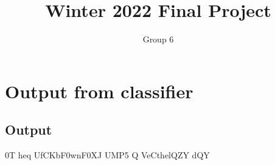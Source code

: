 \documentclass[11pt]{article}
\title{Winter 2022 Final Project}
\author{Group 6}
\begin{document}
\maketitle
\tableofcontents\newpage\newpage
\section{Output from classifier}
\label{section1}
\subsection{Output}
\label{Sec1_L2_Introduction}
0T heq UfCKbF0wnF0XJ UMP5   \newline Q VeCthelQZY dQY
\end{document}
